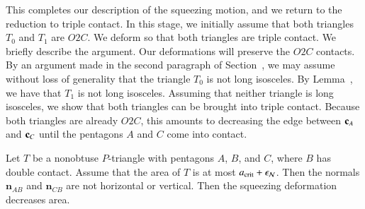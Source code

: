 This completes our description of the squeezing motion, and we return
to the reduction to triple contact.  In this stage, we initially
assume that both triangles $T_0$ and $T_1$ are $O2C$.  We deform so
that both triangles are triple contact.  We briefly describe the
argument.  Our deformations will preserve the $O2C$ contacts.  By an
argument made in the second paragraph of Section~, we may
assume without loss of generality that the triangle $T_0$ is not long
isosceles.  By Lemma~, we have that $T_1$ is not
long isosceles.  Assuming that neither triangle is long isosceles, we
show that both triangles can be brought into triple contact.  Because
both triangles are already $O2C$, this amounts to decreasing the edge
between ${\mathbf c}_A$ and ${\mathbf c}_C$ until the pentagons $A$ and $C$ come into
contact.

\begin{lemma}
  Let $T$ be a nonobtuse $P$-triangle with pentagons $A$, $B$, and
  $C$, where $B$ has double contact.  Assume that the area of $T$ is  at most $a_\text{crit}+\epsilon_{\mathcal N}$.
  Then the normals $\mathbf n_{AB}$ and $\mathbf n_{CB}$ are not horizontal or vertical.
  Then the squeezing
  deformation decreases area.
\end{lemma}

